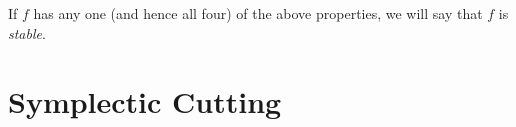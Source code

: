 \documentclass{article}
\begin{document}
	If $f$ has any one (and hence all four) of the above properties, we will say that $f$ is \emph{stable}.
	
	\section{Symplectic Cutting}
	
	
	
	
	
	
	
	
	
	
	
	  
	
	
\end{document}
